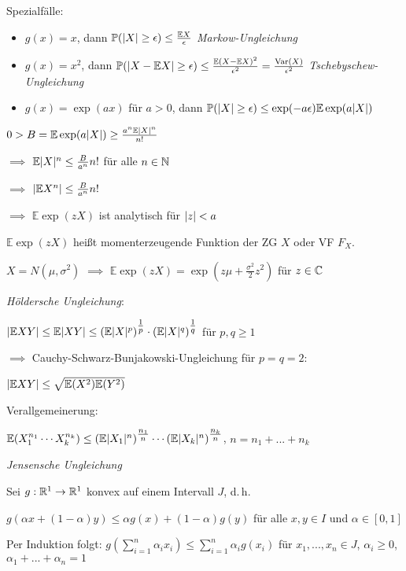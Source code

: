 \documentclass{cheat-sheet}
\renewcommand{\P}{\mathbb{P}}
\newcommand{\E}{\mathbb{E}} %
\newcommand{\Var}{\mathrm{Var}} %
\begin{document}
Spezialfälle:

\begin{itemize}
  \item $g(x) = x$, dann $\P(\abs{X} \geq \epsilon) \leq \frac{\E X}{\epsilon}$ \emph{Markow-Ungleichung}
  \item $g(x) = x^2$, dann $\P(\abs{X - \E X} \geq \epsilon) \leq \frac{\E (X - \E X)^2}{\epsilon^2} = \frac{\Var(X)}{\epsilon^2}$ \emph{Tschebyschew-Ungleichung}
  \item $g(x) = \exp(ax)$ für $a > 0$, dann $\P(\abs{X} \geq \epsilon) \leq \exp(-a\epsilon) \E \exp(a \abs{X})$
\end{itemize}

$0 > B = \E \exp(a \abs{X}) \geq \frac{a^n \E \abs{X}^n}{n!}$

$\implies$ $\E \abs{X}^n \leq \tfrac{B}{a^n} n!$ für alle $n \in \mathbb{N}$

$\implies$ $\abs{\E X^n} \leq \tfrac{B}{a^n} n!$

$\implies$ $\E \exp(z X)$ ist analytisch für $\lvert z\rvert < a$

\begin{defn}
  $\E \exp(z X)$ heißt momenterzeugende Funktion der ZG $X$ oder VF $F_X$.
\end{defn}

$X = N(\mu, \sigma^2)$ $\implies$ $\E \exp(z X) = \exp\left( z\mu + \tfrac{\sigma^2}{2} z^2 \right)$ für $z \in \mathbb{C}$

\emph{Höldersche Ungleichung}:

$\abs{\E X Y} \leq \E \abs{XY} \leq (\E \abs{X}^p)^{\tfrac{1}{p}} \cdot (\E \abs{X}^q)^{\tfrac{1}{q}}$ für $p, q \geq 1$

$\implies$ Cauchy-Schwarz-Bunjakowski-Ungleichung für $p = q = 2$:

$\abs{\E XY} \leq \sqrt{ \E (X^2) \E(Y^2) }$

Verallgemeinerung:

$\E(X_1^{n_1} \cdots X_k^{n_k}) \leq (\E \abs{X_1}^n)^{\tfrac{n_1}{n}} \cdots (\E \abs{X_k}^n)^{\tfrac{n_k}{n}}$, $n = n_1 + ... + n_k$

\emph{Jensensche Ungleichung}

Sei $g : \mathbb{R}^1 \to \mathbb{R}^1$ konvex auf einem Intervall $J$, d.\,h.

$g(\alpha x + (1-\alpha)y) \leq \alpha g(x) + (1-\alpha) g(y)$ für alle $x, y \in I$ und $\alpha \in [0,1]$

Per Induktion folgt: $g(\sum_{i=1}^n \alpha_i x_i) \leq \sum_{i=1}^n \alpha_i g(x_i)$ für $x_1, ..., x_n \in J$, $\alpha_i \geq 0$, $\alpha_1 + ... + \alpha_n = 1$
\end{document}
